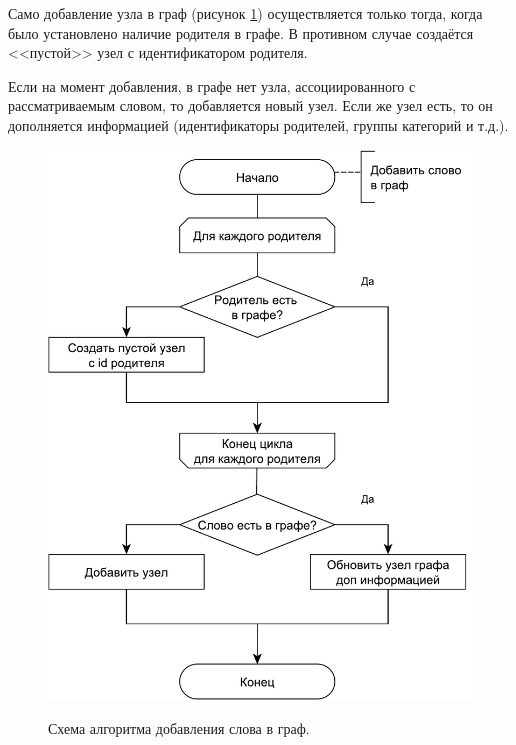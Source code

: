 \newpage

Само добавление узла в граф (рисунок \ref{fig31:image}) осуществляется только тогда, когда было установлено наличие родителя в графе. В противном случае создаётся <<пустой>> узел с идентификатором родителя. 

Если на момент добавления, в графе нет узла, ассоциированного с рассматриваемым словом, то добавляется новый узел. Если же узел есть, то он дополняется информацией (идентификаторы родителей, группы категорий и т.д.).
\begin{figure}[h]
	\begin{center}
		{\includegraphics[scale = 0.6]{img/schemes/pdf/add_node.pdf}}
		\caption{Схема алгоритма добавления слова в граф.}
		\label{fig31:image}
	\end{center}
\end{figure}

